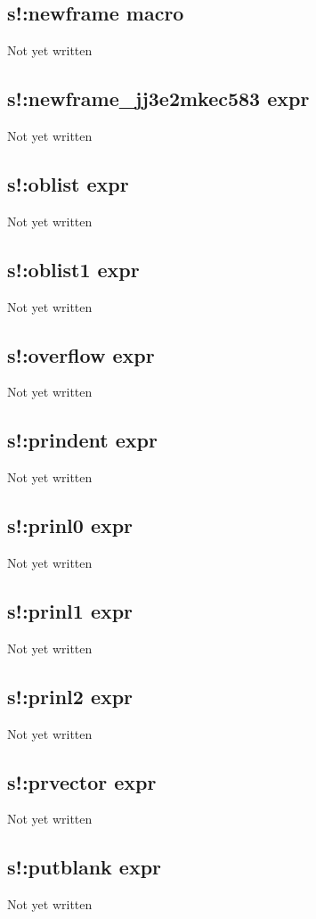\documentclass[a4paper,11pt]{article}
\begin{document}
\subsection{\ttfamily s!:newframe macro}
Not yet written

\subsection{\ttfamily s!:newframe\_jj3e2mkec583 expr}
Not yet written

\subsection{\ttfamily s!:oblist expr}
Not yet written

\subsection{\ttfamily s!:oblist1 expr}
Not yet written

\subsection{\ttfamily s!:overflow expr}
Not yet written

\subsection{\ttfamily s!:prindent expr}
Not yet written

\subsection{\ttfamily s!:prinl0 expr}
Not yet written

\subsection{\ttfamily s!:prinl1 expr}
Not yet written

\subsection{\ttfamily s!:prinl2 expr}
Not yet written

\subsection{\ttfamily s!:prvector expr}
Not yet written

\subsection{\ttfamily s!:putblank expr}
Not yet written
\end{document}

